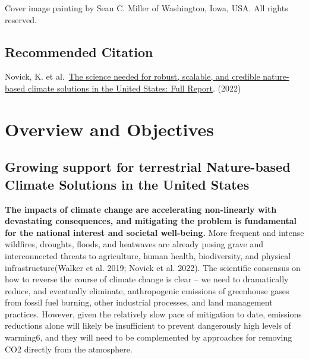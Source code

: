 \documentclass[
  letterpaper,
  DIV=11,
  numbers=noendperiod]{scrreprt}
\begin{document}
Cover image painting by Sean C. Miller of Washington, Iowa, USA. All
rights reserved.

\hypertarget{recommended-citation}{%
\section*{Recommended Citation}\label{recommended-citation}}


Novick, K. et al.~\href{https://doi.org/10.5967/n7r9-7j83}{The science
needed for robust, scalable, and credible nature-based climate solutions
in the United States: Full Report}. (2022)


\hypertarget{sec-overview}{%
\chapter{Overview and Objectives}\label{sec-overview}}

\hypertarget{sec-support}{%
\section{Growing support for terrestrial Nature-based Climate Solutions
in the United States}\label{sec-support}}

\textbf{The impacts of climate change are accelerating non-linearly with
devastating consequences, and mitigating the problem is fundamental for
the national interest and societal well-being.} More frequent and
intense wildfires, droughts, floods, and heatwaves are already posing
grave and interconnected threats to agriculture, human health,
biodiversity, and physical infrastructure(Walker et al. 2019; Novick et
al. 2022). The scientific consensus on how to reverse the course of
climate change is clear -- we need to dramatically reduce, and
eventually eliminate, anthropogenic emissions of greenhouse gases from
fossil fuel burning, other industrial processes, and land management
practices. However, given the relatively slow pace of mitigation to
date, emissions reductions alone will likely be insufficient to prevent
dangerously high levels of warming6, and they will need to be
complemented by approaches for removing CO2 directly from the
atmosphere.
\end{document}
